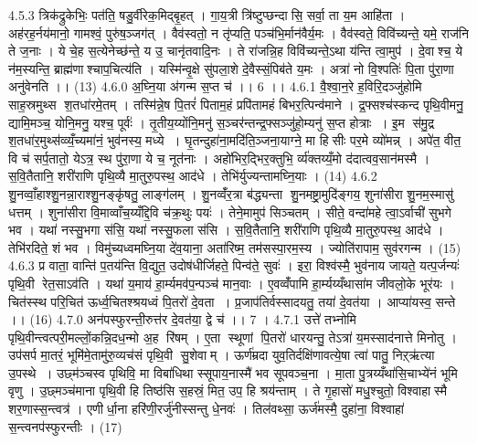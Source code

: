 4.5.3
त्रिक॑द्रुकेभिः॒ पत॑ति॒ षडु॒र्वीरेक॒मिद्बृ॒हत् । गा॒य॒त्री त्रि॑ष्टुप्छन्दा॑सि॒ सर्वा॒ ता य॒म आहि॑ता । अह॑रह॒र्नय॑मानो॒ गामश्वं॒ पुरु॑ष॒ञ्जग॑त् । वैव॑स्वतो॒ न तृ॑प्यति॒ पञ्च॑भि॒र्मान॑वैर्य॒मः । वैव॑स्वते॒ विवि॑च्यन्ते॒ यमे॒ राज॑नि ते ज॒नाः । ये चे॒ह स॒त्येनेच्छ॑न्ते॒ य उ॒ चानृ॑तवादि॒नः । ते रा॑जन्नि॒ह विवि॑च्यन्ते॒ऽथा य॑न्ति त्वा॒मुप॑ । दे॒वाश्च॒ ये न॑म॒स्यन्ति॒ ब्राह्म॑णाश्चाप॒चित्य॑ति । यस्मि॑न्वृ॒क्षे सु॑पला॒शे दे॒वैस्सं॒पिब॑ते य॒मः । अत्रा॑ नो वि॒श्पतिः॑ पि॒ता पु॑रा॒णा अनु॑वेनति ।। (13)
4.6.0
अ॒घ्नि॒या अ॑गन्म स॒प्त च॑ ।। 6 ।।
4.6.1
वै॒श्वा॒न॒रे ह॒विरि॒दञ्जु॑होमि साह॒स्रमुथ्स॑ श॒तधा॑रमे॒तम् । तस्मि॑न्ने॒ष पि॒तरं॑ पिताम॒हं प्रपि॑तामहं बिभर॒त्पिन्व॑माने । द्र॒फ्सश्च॑स्कन्द पृथि॒वीमनु॒ द्यामि॒मञ्च॒ योनि॒मनु॒ यश्च॒ पूर्वः॑ । तृ॒तीय॒य्योंनि॒मनु॑ स॒ञ्चर॑न्तन्द्र॒फ्सञ्जु॑हो॒म्यनु॑ स॒प्त होत्राः । इ॒म स॑मु॒द्र श॒तधा॑र॒मुथ्स॑व्व्यँ॒च्यमा॑नं॒ भुव॑नस्य॒ मध्ये । घृ॒तन्दुहा॑ना॒मदि॑ति॒ञ्जना॒याग्ने॒ मा हि॑सीः पर॒मे व्यो॑मन्न् । अपे॑त॒ वीत॒ वि च॑ सर्प॒तातो॒ येऽत्र॒ स्थ पु॑रा॒णा ये च॒ नूत॑नाः । अहो॑भिर॒द्भिर॒क्तुभि॒ र्व्य॑क्तय्यँ॒मो द॑दात्वव॒सान॑मस्मै । स॒वि॒तैतानि॒ शरी॑राणि पृथि॒व्यै मा॒तुरु॒पस्थ॒ आद॑धे । तेभि॑र्युज्यन्तामघ्नि॒याः । (14)
4.6.2
शु॒नव्वाँ॒हाश्शु॒नन्ना॒राश्शु॒नङ्कृ॑षतु॒ लाङ्ग॑लम् । शु॒नव्वँ॑र॒त्रा ब॑द्ध्यन्ता शु॒नमष्ट्रा॒मुदि॑ङ्गय॒ शुना॑सीरा शु॒नम॒स्मासु॑ धत्तम् । शुना॑सीरा वि॒माव्वाँच॒य्यँद्दि॒वि च॑क्र॒थुः पयः॑ । तेने॒मामुप॑ सिञ्चतम् । सीते॒ वन्दा॑महे त्वा॒ऽर्वाची॑ सुभगे भव । यथा॑ नस्सु॒भगा स॑सि॒ यथा॑ नस्सु॒फला स॑सि । स॒वि॒तैतानि॒ शरी॑राणि पृथि॒व्यै मा॒तुरु॒पस्थ॒ आद॑धे । तेभि॑रदिते॒ शं भव । विमु॑च्यध्वमघ्नि॒या दे॑व॒याना॒ अता॑रिष्म॒ तम॑सस्पा॒रम॒स्य । ज्योति॑रापाम॒ सुव॑रगन्म । (15)
4.6.3
प्र वाता॒ वान्ति॑ प॒तय॑न्ति वि॒द्युत॒ उदोष॑धीर्जिहते॒ पिन्व॑ते॒ सुवः॑ । इरा॒ विश्व॑स्मै॒ भुव॑नाय जायते॒ यत्प॒र्जन्यः॑ पृथि॒वी रेत॒साऽव॑ति । यथा॑ य॒माय॑ हा॒र्म्यमव॑प॒न्पञ्च॑ मान॒वाः । ए॒वव्वँ॑पामि हा॒र्म्यय्यँथासा॑म जीवलो॒के भूर॑यः । चित॑स्स्थ परि॒चित॑ ऊर्ध्व॒चितश्श्रयध्वं पि॒तरो॑ दे॒वता । प्र॒जाप॑तिर्वस्सादयतु॒ तया॑ दे॒वत॑या । आप्या॑यस्व॒ सन्ते ।। (16)
4.7.0
अन॑पस्फुरन्ती॒रुत्त॑र दे॒वत॑या॒ द्वे च॑ ।। 7 ।
4.7.1
उत्ते॑ तभ्नोमि पृथि॒वीन्त्वत्परी॒मल्लों॒कन्नि॒दध॒न्मो अ॒ह रि॑षम् । ए॒ता स्थूणां पि॒तरो॑ धारयन्तु॒ तेऽत्रा॑ य॒मस्साद॑नात्ते मिनोतु । उप॑सर्प मा॒तरं॒ भूमि॑मे॒तामु॑रु॒व्यच॑सं पृथि॒वी सु॒शेवाम् । ऊर्ण॑म्रदा युव॒तिर्दक्षि॑णावत्ये॒षा त्वा॑ पातु॒ निऱ्ऋ॑त्या उ॒पस्थे । उछ्म॑ञ्चस्व पृथिवि॒ मा विबा॑धिथा स्सूपाय॒नास्मै॑ भव सूपवञ्च॒ना । मा॒ता पु॒त्रय्यँथा॑सि॒चाभ्ये॑नं भूमि वृणु । उ॒छ्मञ्च॑माना पृथि॒वी हि तिष्ठ॑सि स॒हस्रं॒ मित॒ उप॒ हि श्रय॑न्ताम् । ते गृ॒हासो॑ मधु॒श्चुतो॒ विश्वाहास्मै शर॒णास्स॒न्त्वत्र॑ । एणीर्धा॒ना हरि॑णी॒रर्जु॑नीस्सन्तु धे॒नवः॑ । तिल॑वथ्सा॒ ऊर्ज॑मस्मै॒ दुहा॑ना॒ विश्वाहा॑ स॒न्त्वनप॑स्फुरन्तीः । (17)

